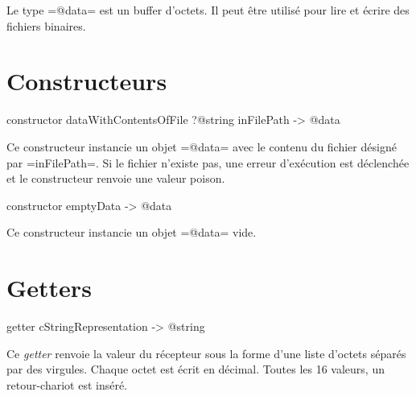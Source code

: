 



Le type \ggs=@data= est un buffer d'octets. Il peut être utilisé pour lire et écrire des fichiers binaires.




\section{Constructeurs}



\begin{galgas}
constructor dataWithContentsOfFile ?@string inFilePath -> @data
\end{galgas}

Ce constructeur instancie un objet \ggs=@data= avec le contenu du fichier désigné par \ggs=inFilePath=. Si le fichier n'existe pas, une erreur d'exécution est déclenchée et le constructeur renvoie une valeur poison.





\begin{galgas}
constructor emptyData -> @data
\end{galgas}

Ce constructeur instancie un objet \ggs=@data= vide.








\section{Getters}



\begin{galgas}
getter cStringRepresentation -> @string
\end{galgas}

Ce \emph{getter} renvoie la valeur du récepteur sous la forme d'une liste d'octets séparés par des virgules. Chaque octet est écrit en décimal. Toutes les 16 valeurs, un retour-chariot est inséré.




